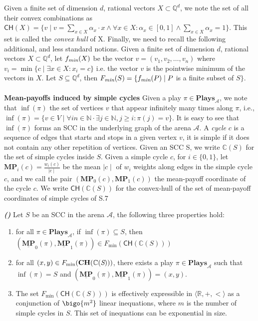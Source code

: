 Given a finite set of dimension $d$, rational vectors $X \subset \mathbb{Q}^d$, we note the set of all their convex combinations as $\mathsf{CH}(X) = \{v \mid v = \sum_{x \in X} \alpha_x\cdot x \land \forall x \in X: \alpha_x \in [0,1] \land \sum_{x \in X}\alpha_x = 1\}$. This set is called the \textit{convex hull} of X. Finally, we need to recall the following additional, and less standard notions. Given a finite set of dimension $d$, rational vectors $X \subset \mathbb{Q}^d$, let $f_{\emph{min}}(X)$ be the vector $v = (v_1, v_2, \dots , v_n)$ where $v_i = \min \{c \mid \exists x \in X: x_i = c \}$ i.e. the vector $v$ is the pointwise minimum of the vectors in $X$. Let $S \subseteq \mathbb{Q}^d$, then $F_{\emph{min}}(S) = \{ f_{\emph{min}}(P) \mid P $ is a finite subset of $S\}$.
\\
\\
\textbf{Mean-payoffs induced by simple cycles} Given a play $\pi \in \mathbf{Plays}_{\mathcal{A}}$, we note that $\inf(\pi)$ the set of vertices $v$ that appear infinitely many times along $\pi$, i.e., $\inf(\pi) = \{v \in V \mid \forall in \in \mathbb{N}\cdot \exists j \in \mathbb{N}, j \geqslant i: \pi(j) = v \}$. It is easy to see that $\inf(\pi)$ forms an SCC in the underlying graph of the arena $\mathcal{A}$. A \textit{cycle} $c$ is a sequence of edges that starts and stops in a given vertex $v$, it is simple if it does not contain any other repetition of vertices. Given an SCC S, we write $\mathbb{C}(S)$ for the set of simple cycles inside $S$. Given a simple cycle $c$, for $i \in \{0,1\}$, let $\mathbf{MP}_i(c) = \frac{w_i(c)}{\mid c \mid}$ be the mean $\mid c \mid$ of $w_i$ weights along edges in the simple cycle $c$, and we call the pair $(\mathbf{MP}_0(c), \mathbf{MP}_1(c))$ the mean-payoff coordinate of the cycle $c$. We write $\mathsf{CH}(\mathbb{C}(S))$ for the convex-hull of the set of mean-payoff coordinates of simple cycles of S.7

\begin{lemma}
\label{lemCHToPlay}
\textbf{\emph{(\cite{FGR20})}} Let $S$ be an SCC in the arena $\mathcal{A}$, the following three properties hold:
\begin{enumerate}
    \item for all $\pi \in \mathbf{Plays}_{\mathcal{A}}$, if $\inf(\pi) \subseteq S$, then $(\underline{\mathbf{MP}}_0(\pi), \underline{\mathbf{MP}}_1(\pi)) \in F_{\min}(\mathsf{CH}(\mathbb{C}(S)))$
    \item for all $(x,y) \in F_{\min}(\mathbf{CH}(\mathbb{C}(\emph{S})))$, there exists a play $\pi \in \mathbf{Plays}_{\mathcal{A}}$ such that $\inf(\pi) = S$ and $(\underline{\mathbf{MP}}_0(\pi), \underline{\mathbf{MP}}_1(\pi)) = (x,y)$.
    \item The set $F_{\min}(\mathsf{CH}(\mathbb{C}(S)))$ is effectively expressible in $\langle \mathbb{R}, +, < \rangle$ as a conjunction of $\bigo{m^2}$ linear inequations, where $m$ is the number of simple cycles in $S$. This set of inequations can be exponential in size.
\end{enumerate}
\end{lemma}

